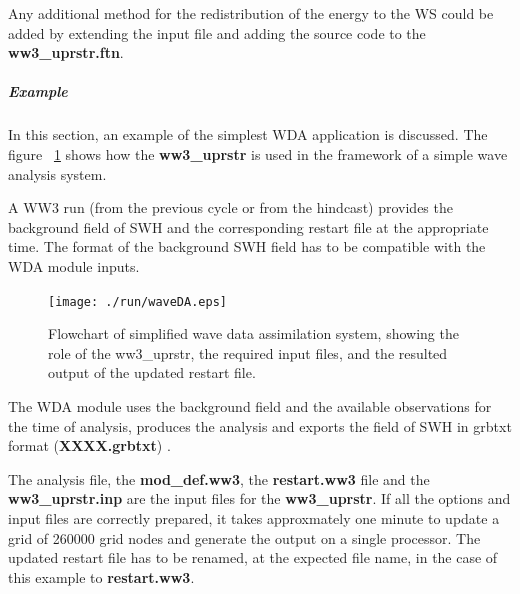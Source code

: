 Any additional method for the redistribution of the energy to the WS could be added 
by extending the input file and adding the source code to the \textbf{ww3\_uprstr.ftn}.

\subparagraph{Example \newline}
In this section, an example of the simplest WDA application is discussed.
The figure ~\ref{fig:waveDAflowchart} shows how the \textbf{ww3\_uprstr} 
is used in the framework of a simple wave analysis system. \newline

A WW3 run (from the previous cycle or from the hindcast) provides the
background field of SWH and the corresponding restart file at the appropriate time. 
The format of the background SWH field has to be compatible with the WDA module inputs.

\begin{figure} \begin{center}
\texttt{[image: ./run/waveDA.eps]}
\caption{Flowchart of simplified wave data assimilation system, 
showing the role of the {ww3\_uprstr}, the required input files,
and the resulted output of the updated restart file.}
\label{fig:waveDAflowchart} \botline
\end{center}
\end{figure}

The WDA module uses the background field and the available observations
for the time of analysis, produces the analysis and exports 
the field of SWH in grbtxt format (\textbf{XXXX.grbtxt}) .

The analysis file, the \textbf{mod\_def.ww3}, the \textbf{restart.ww3} file and 
the \textbf{ww3\_uprstr.inp} are the input files for the \textbf{ww3\_uprstr}. 
If all the options and input files are correctly prepared, it takes approxmately 
one minute to update a grid of 260000 grid nodes and generate the output on a single processor. 
The updated restart file has to be renamed, at the expected file name, in the case of this
example to \textbf{restart.ww3}. \newline  

   \noindent{}


\pb
